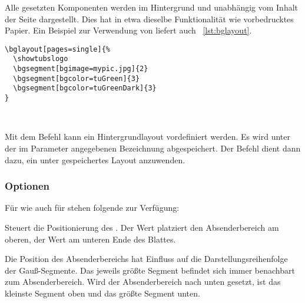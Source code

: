 Alle gesetzten Komponenten werden im Hintergrund und unabhängig vom Inhalt der Seite
dargestellt. Dies hat in etwa dieselbe Funktionalität wie vorbedrucktes Papier.
Ein Beispiel zur Verwendung von  liefert auch
\lstlistingname~\ref{lst:bglayout}.


\begin{lstlisting}[captionpos=b,caption={Beispiel-Nutzung von bglayout},label=lst:bglayout]
\bglayout[pages=single]{%
  \showtubslogo
  \bgsegment[bgimage=mypic.jpg]{2}
  \bgsegment[bgcolor=tuGreen]{3}
  \bgsegment[bgcolor=tuGreenDark]{3}
}
\end{lstlisting}


\begin{Declaration}
  \\
\end{Declaration}

\begin{sloppypar}
Mit dem Befehl  kann ein Hintergrundlayout vordefiniert werden.
Es wird unter der im Parameter  angegebenen Bezeichnung
abgespeichert.
Der Befehl  dient dann dazu, ein unter  gespeichertes
Layout anzuwenden.
\end{sloppypar}

\subsubsection{Optionen}\label{sec:gausslayout:bglayout:options}

Für  wie auch für  stehen folgende
 zur Verfügung:

\begin{Declaration}
\end{Declaration}

Steuert die Positionierung des .
Der Wert  platziert den Absenderbereich am oberen,
der Wert  am unteren Ende des Blattes.

\begin{hint}
  Die Position des Absenderbereichs hat Einfluss auf die Darstellungsreihenfolge
  der Gauß-Segmente. Das jeweils größte Segment befindet sich immer 
  benachbart zum Absenderbereich.
  Wird der Absenderbereich nach unten gesetzt, ist das kleinste Segment oben
  und das größte Segment unten.
\end{hint}

